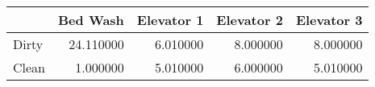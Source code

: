 \begin{tabular}{lrrrr}
\toprule
 & Bed Wash & Elevator 1 & Elevator 2 & Elevator 3 \\
\midrule
Dirty & 24.110000 & 6.010000 & 8.000000 & 8.000000 \\
Clean & 1.000000 & 5.010000 & 6.000000 & 5.010000 \\
\bottomrule
\end{tabular}
